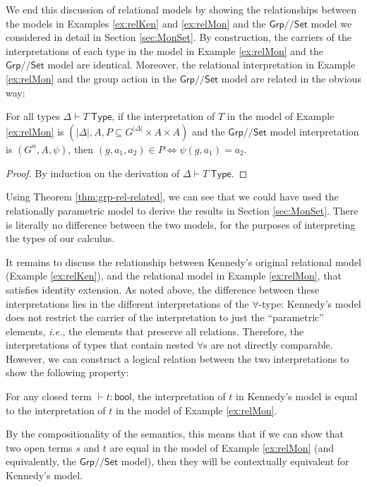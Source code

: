 \documentclass[a4paper,UKenglish]{lipics}
\newcommand{\msf}[1]{\mathsf{#1}} %
\newcommand{\Grp}{\msf{Grp}}
\newcommand{\Set}{\msf{Set}}
\newcommand{\Lslice}[1]{#1/\!/\Set}
\newcommand{\GrpSet}{\Lslice{\Grp}}
\begin{document}
We end this discussion of relational models by showing the
relationships between the models in Examples \ref{ex:relKen} and
\ref{ex:relMon} and the $\GrpSet$ model we considered in detail in
Section \ref{sec:MonSet}. By construction, the carriers of the
interpretations of each type in the model in Example \ref{ex:relMon}
and the $\GrpSet$ model are identical. Moreover, the relational
interpretation in Example \ref{ex:relMon} and the group action in the
$\GrpSet$ model are related in the obvious way:
\begin{theorem}\label{thm:grp-rel-related}
  For all types $\Delta \vdash T~\msf{Type}$, if the interpretation of
  $T$ in the model of Example \ref{ex:relMon} is $(|\Delta|, A, P
  \subseteq G^{|\Delta|} \times A \times A)$ and the $\GrpSet$ model
  interpretation is $(G^n, A, \psi)$, then $(g, a_1, a_2) \in P
  \Leftrightarrow \psi(g,a_1) = a_2$.
\end{theorem}
\begin{proof}
  By induction on the derivation of $\Delta \vdash T~\msf{Type}$.
\end{proof}

Using Theorem \ref{thm:grp-rel-related}, we can see that we could have
used the relationally parametric model to derive the results in
Section \ref{sec:MonSet}. There is literally no difference between the
two models, for the purposes of interpreting the types of our
calculus.

It remains to discuss the relationship between Kennedy's original
relational model (Example \ref{ex:relKen}), and the relational model
in Example \ref{ex:relMon}, that satisfies identity extension. As
noted above, the difference between these interpretations lies in the
different interpretations of the $\forall$-type: Kennedy's model does
not restrict the carrier of the interpretation to just the
``parametric'' elements, \emph{i.e.}, the elements that preserve all
relations. Therefore, the interpretations of types that contain nested
$\forall$s are not directly comparable. However, we can construct a
logical relation between the two interpretations to show the following
property:

\begin{theorem}\label{thm:closed-prog-equiv}
  For any closed term $\vdash t : \msf{bool}$, the interpretation of
  $t$ in Kennedy's model is equal to the interpretation of $t$ in the
  model of Example \ref{ex:relMon}.
\end{theorem}

By the compositionality of the semantics, this means that if we can
show that two open terms $s$ and $t$ are equal in the model of Example
\ref{ex:relMon} (and equivalently, the $\GrpSet$ model), then they
will be contextually equivalent for Kennedy's model.
\end{document}
